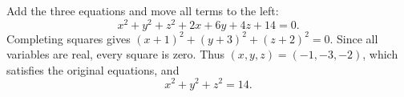 Add the three equations and move all terms to the left:
\[
x^2+y^2+z^2+2x+6y+4z+14=0.
\]
Completing squares gives $(x+1)^2+(y+3)^2+(z+2)^2=0$. Since all variables are real, every square is zero. Thus $(x,y,z)=(-1,-3,-2)$, which satisfies the original equations, and
\[
\boxed{x^2+y^2+z^2=14}.
\]
